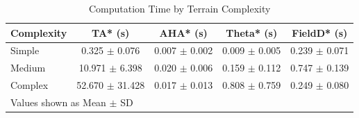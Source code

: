 \begin{table}[htbp]
\centering
\caption{Computation Time by Terrain Complexity}
\label{tab:complexity_breakdown}
\begin{tabular}{lcccc}
\hline
Complexity & TA* (s) & AHA* (s) & Theta* (s) & FieldD* (s) \\
\hline
Simple & 0.325 $\pm$ 0.076 & 0.007 $\pm$ 0.002 & 0.009 $\pm$ 0.005 & 0.239 $\pm$ 0.071 \\
Medium & 10.971 $\pm$ 6.398 & 0.020 $\pm$ 0.006 & 0.159 $\pm$ 0.112 & 0.747 $\pm$ 0.139 \\
Complex & 52.670 $\pm$ 31.428 & 0.017 $\pm$ 0.013 & 0.808 $\pm$ 0.759 & 0.249 $\pm$ 0.080 \\
\hline
\multicolumn{5}{l}{\footnotesize Values shown as Mean $\pm$ SD} \\
\end{tabular}
\end{table}